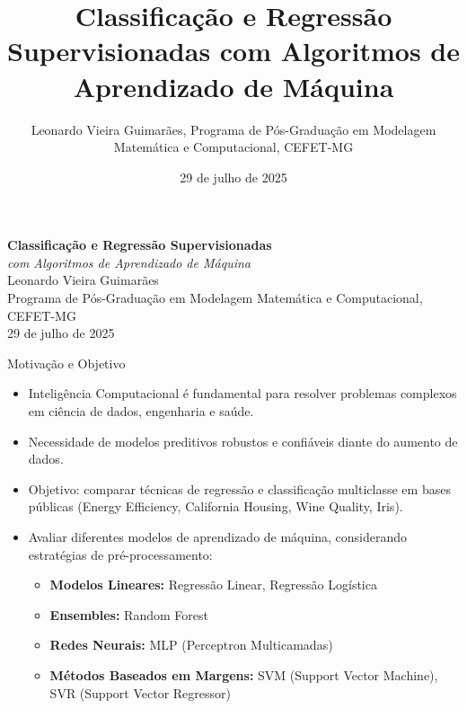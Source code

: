 \documentclass[aspectratio=169]{beamer}
\title{Classificação e Regressão Supervisionadas com Algoritmos de Aprendizado de Máquina}
\author{Leonardo Vieira Guimarães, Programa de Pós-Graduação em Modelagem Matemática e Computacional, CEFET-MG}
\date{29 de julho de 2025}
\begin{document}
{
  \begin{frame}[plain]
    \vspace{0.5cm}
    \centering
    {\Huge\textbf{Classificação e Regressão Supervisionadas}}\\[0.5em]
    {\Large\textit{com Algoritmos de Aprendizado de Máquina}}\\[1.5em]
    \vspace{0.5cm}
    {\large Leonardo Vieira Guimarães}\\[0.5em]
    {\normalsize Programa de Pós-Graduação em Modelagem Matemática e Computacional, CEFET-MG}\\[1em]
    {\normalsize 29 de julho de 2025}
    \vfill
  \end{frame}
}

\begin{frame}{Motivação e Objetivo}
  \begin{itemize}
    \item Inteligência Computacional é fundamental para resolver problemas complexos em ciência de dados, engenharia e saúde.
    \item Necessidade de modelos preditivos robustos e confiáveis diante do aumento de dados.
    \item Objetivo: comparar técnicas de regressão e classificação multiclasse em bases públicas (Energy Efficiency, California Housing, Wine Quality, Iris).
    \item Avaliar diferentes modelos de aprendizado de máquina, considerando estratégias de pré-processamento:
    \begin{itemize}
      \item \textbf{Modelos Lineares:} Regressão Linear, Regressão Logística
      \item \textbf{Ensembles:} Random Forest
      \item \textbf{Redes Neurais:} MLP (Perceptron Multicamadas)
      \item \textbf{Métodos Baseados em Margens:} SVM (Support Vector Machine), SVR (Support Vector Regressor)
    \end{itemize}
  \end{itemize}
\end{frame}
\end{document}
